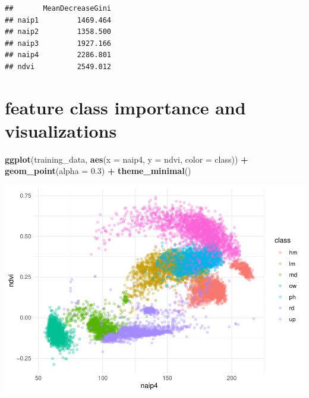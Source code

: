 \documentclass[
]{article}
\newenvironment{Shaded}{\begin{snugshade}}{\end{snugshade}}
\newcommand{\AttributeTok}[1]{\textcolor[rgb]{0.13,0.29,0.53}{#1}}
\newcommand{\CommentTok}[1]{\textcolor[rgb]{0.56,0.35,0.01}{\textit{#1}}}
\newcommand{\ConstantTok}[1]{\textcolor[rgb]{0.56,0.35,0.01}{#1}}
\newcommand{\FloatTok}[1]{\textcolor[rgb]{0.00,0.00,0.81}{#1}}
\newcommand{\FunctionTok}[1]{\textcolor[rgb]{0.13,0.29,0.53}{\textbf{#1}}}
\newcommand{\NormalTok}[1]{#1}
\newcommand{\SpecialCharTok}[1]{\textcolor[rgb]{0.81,0.36,0.00}{\textbf{#1}}}
\newcommand{\StringTok}[1]{\textcolor[rgb]{0.31,0.60,0.02}{#1}}
\begin{document}
\begin{Shaded}
\end{Shaded}

\begin{verbatim}
##       MeanDecreaseGini
## naip1         1469.464
## naip2         1358.500
## naip3         1927.166
## naip4         2286.801
## ndvi          2549.012
\end{verbatim}

\section{feature class importance and
visualizations}\label{feature-class-importance-and-visualizations-2}

\begin{Shaded}
\begin{Highlighting}[]
\FunctionTok{ggplot}\NormalTok{(training\_data, }\FunctionTok{aes}\NormalTok{(}\AttributeTok{x =}\NormalTok{ naip4, }\AttributeTok{y =}\NormalTok{ ndvi, }\AttributeTok{color =}\NormalTok{ class)) }\SpecialCharTok{+}
  \FunctionTok{geom\_point}\NormalTok{(}\AttributeTok{alpha =} \FloatTok{0.3}\NormalTok{) }\SpecialCharTok{+}
  \FunctionTok{theme\_minimal}\NormalTok{()}
\end{Highlighting}
\end{Shaded}

\includegraphics{veg_model_new_class_files/figure-latex/unnamed-chunk-13-1.pdf}
\end{document}

